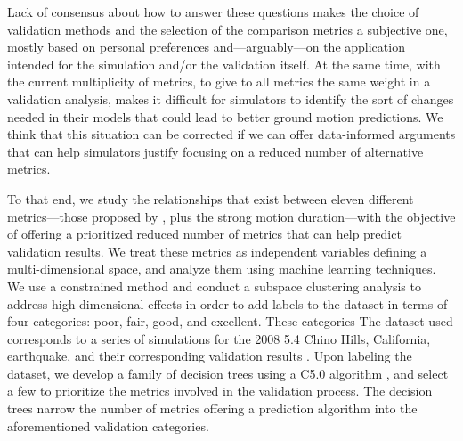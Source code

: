 
Lack of consensus about how to answer these questions makes the choice of validation methods and the selection of the comparison metrics a subjective one, mostly based on personal preferences and---arguably---on the application intended for the simulation and/or the validation itself. At the same time, with the current multiplicity of metrics, to give to all metrics the same weight in a validation analysis, makes it difficult for simulators to identify the sort of changes needed in their models that could lead to better ground motion predictions. We think that this situation can be corrected if we can offer data-informed arguments that can help simulators justify focusing on a reduced number of alternative metrics.

To that end, we study the relationships that exist between eleven different metrics---those proposed by \citet{Anderson_2004_Proc}, plus the strong motion duration---with the objective of offering a prioritized reduced number of metrics that can help predict validation results. We treat these metrics as independent variables defining a multi-dimensional space, and analyze them using machine learning techniques. We use a constrained \kmeans{} method \citep[e.g.,][]{Macqueen_1967_Proc, Wagstaff_2001_Proc} and conduct a subspace clustering analysis to address high-dimensional effects in order to add labels to the dataset in terms of four categories: poor, fair, good, and excellent. These categories 
The dataset used corresponds to a series of simulations for the 2008  5.4 Chino Hills, California, earthquake, and their corresponding validation results \citep{Taborda_2014_BSSA}. Upon labeling the dataset, we develop a family of decision trees using a C5.0 algorithm \citep[][]{Quinlan_1993_Book, Quinlan_1996_JAIR}, and select a few to prioritize the metrics involved in the validation process. The decision trees narrow the number of metrics offering a prediction algorithm into the aforementioned validation categories. 

